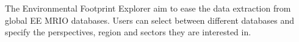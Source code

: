 \label{fig:select} The Environmental Footprint Explorer aim to ease the data extraction from global EE MRIO databases. Users can select between different databases and specify the perspectives, region and sectors they are interested in.
